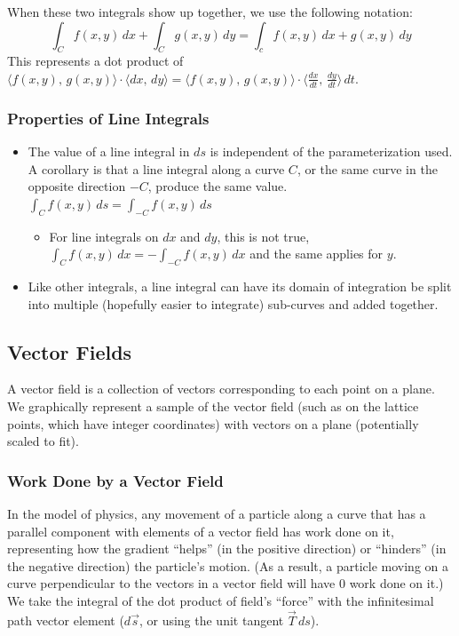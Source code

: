 \documentclass{article}
\newcommand{\vect}[1]{\ensuremath{\overrightarrow{#1}}}
\begin{document}
When these two integrals show up together, we use the following notation:
$$\int_Cf(x,y)\,dx+\int_Cg(x,y)\,dy=\int_cf(x,y)\,dx+g(x,y)\,dy$$
This represents a dot product of $\langle f(x,y),\,g(x,y)\rangle\cdot\langle dx,\,dy\rangle=\langle f(x,y),\,g(x,y)\rangle\cdot\langle \frac{dx}{dt},\,\frac{dy}{dt}\rangle\,dt$.
\subsubsection{Properties of Line Integrals}
\begin{itemize}
    \item The value of a line integral in $ds$ is independent of the parameterization used. A corollary is that a line integral along a curve $C$, or the same curve in the opposite direction $-C$, produce the same value. $\int_C f(x,y)\,ds=\int_{-C}f(x,y)\,ds$
    \begin{itemize}
        \item For line integrals on $dx$ and $dy$, this is not true, $\int_Cf(x,y)\,dx=-\int_{-C}f(x,y)\,dx$ and the same applies for $y$.
    \end{itemize}
    \item Like other integrals, a line integral can have its domain of integration be split into multiple (hopefully easier to integrate) sub-curves and added together.
\end{itemize}

\subsection{Vector Fields}
A vector field is a collection of vectors corresponding to each point on a plane. We graphically represent a sample of the vector field (such as on the lattice points, which have integer coordinates) with vectors on a plane (potentially scaled to fit).
\subsubsection{Work Done by a Vector Field}
In the model of physics, any movement of a particle along a curve that has a parallel component with elements of a vector field has work done on it, representing how the gradient ``helps'' (in the positive direction) or ``hinders'' (in the negative direction) the particle's motion. (As a result, a particle moving on a curve perpendicular to the vectors in a vector field will have 0 work done on it.) We take the integral of the dot product of field's ``force'' with the infinitesimal path vector element ($d\vect{s}$, or using the unit tangent $\vect{T}\,ds$).
\end{document}
